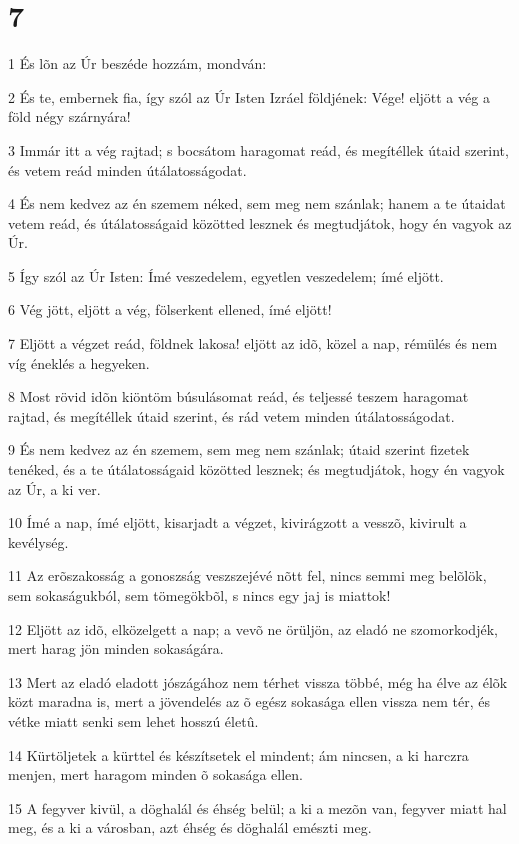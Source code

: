\chapter{7}

\par 1 És lõn az Úr beszéde hozzám, mondván:
\par 2 És te, embernek fia, így szól az Úr Isten Izráel földjének: Vége! eljött a vég a föld négy szárnyára!
\par 3 Immár itt a vég rajtad; s bocsátom haragomat reád, és megítéllek útaid szerint, és vetem reád minden útálatosságodat.
\par 4 És nem kedvez az én szemem néked, sem meg nem szánlak; hanem a te útaidat vetem reád, és útálatosságaid közötted lesznek és megtudjátok, hogy én vagyok az Úr.
\par 5 Így szól az Úr Isten: Ímé veszedelem, egyetlen veszedelem; ímé eljött.
\par 6 Vég jött, eljött a vég, fölserkent ellened, ímé eljött!
\par 7 Eljött a végzet reád, földnek lakosa! eljött az idõ, közel a nap, rémülés és nem víg éneklés a hegyeken.
\par 8 Most rövid idõn kiöntöm búsulásomat reád, és teljessé teszem haragomat rajtad, és megítéllek útaid szerint, és rád vetem minden útálatosságodat.
\par 9 És nem kedvez az én szemem, sem meg nem szánlak; útaid szerint fizetek tenéked, és a te útálatosságaid közötted lesznek; és megtudjátok, hogy én vagyok az Úr, a ki ver.
\par 10 Ímé a nap, ímé eljött, kisarjadt a végzet, kivirágzott a vesszõ, kivirult a kevélység.
\par 11 Az erõszakosság a gonoszság veszszejévé nõtt fel, nincs semmi meg belõlök, sem sokaságukból, sem tömegökbõl, s nincs egy jaj is miattok!
\par 12 Eljött az idõ, elközelgett a nap; a vevõ ne örüljön, az eladó ne szomorkodjék, mert harag jön minden sokaságára.
\par 13 Mert az eladó eladott jószágához nem térhet vissza többé, még ha élve az élõk közt maradna is, mert a jövendelés az õ egész sokasága ellen vissza nem tér, és vétke miatt senki sem lehet hosszú életû.
\par 14 Kürtöljetek a kürttel és készítsetek el mindent; ám nincsen, a ki harczra menjen, mert haragom minden õ sokasága ellen.
\par 15 A fegyver kivül, a döghalál és éhség belül; a ki a mezõn van, fegyver miatt hal meg, és a ki a városban, azt éhség és döghalál emészti meg.
